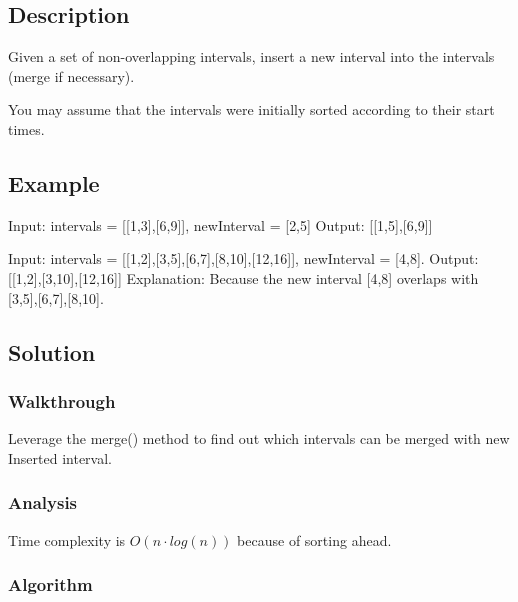 \documentclass[]{book}
\begin{document}
\hypertarget{description-22}{%
\subsection{Description}\label{description-22}}

Given a set of non-overlapping intervals, insert a new interval into the intervals (merge if necessary).

You may assume that the intervals were initially sorted according to their start times.

\hypertarget{example-21}{%
\subsection{Example}\label{example-21}}

Input: intervals = {[}{[}1,3{]},{[}6,9{]}{]}, newInterval = {[}2,5{]} Output: {[}{[}1,5{]},{[}6,9{]}{]}

Input: intervals = {[}{[}1,2{]},{[}3,5{]},{[}6,7{]},{[}8,10{]},{[}12,16{]}{]}, newInterval = {[}4,8{]}. Output: {[}{[}1,2{]},{[}3,10{]},{[}12,16{]}{]}
Explanation: Because the new interval {[}4,8{]} overlaps with {[}3,5{]},{[}6,7{]},{[}8,10{]}.

\hypertarget{solution-17}{%
\subsection{Solution}\label{solution-17}}

\hypertarget{walkthrough-21}{%
\subsubsection{Walkthrough}\label{walkthrough-21}}

Leverage the merge() method to find out which intervals can be merged with new Inserted interval.

\hypertarget{analysis-23}{%
\subsubsection{Analysis}\label{analysis-23}}

Time complexity is \(O(n \cdot log(n))\) because of sorting ahead.

\hypertarget{algorithm-23}{%
\subsubsection{Algorithm}\label{algorithm-23}}
\end{document}
